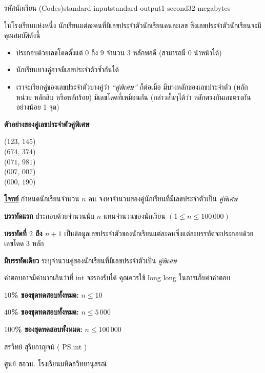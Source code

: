 \documentclass[11pt,a4paper]{article}
\begin{document}
\begin{problem}{รหัสนักเรียน (Codes)}{standard input}{standard output}{1 second}{32 megabytes}

ในโรงเรียนแห่งหนึ่ง นักเรียนแต่ละคนที่มีเลขประจำตัวนักเรียนคนละเลข ซึ่งเลขประจำตัวนักเรียนจะมีคุณสมบัติดังนี้

\begin{itemize}

\item ประกอบด้วยเลขโดดตั้งแต่ $0$ ถึง $9$ จำนวน $3$ หลักพอดี (สามารถมี $0$ นำหน้าได้)

       \item นักเรียนบางคู่อาจมีเลขประจำตัวซ้ำกันได้

       \item เราจะเรียกคู่ของเลขประจำตัวบางคู่ว่า \textit{“คู่พิเศษ”} ก็ต่อเมื่อ มีบางหลักของเลขประจำตัว (หลักหน่วย หลักสิบ หรือหลักร้อย) มีเลขโดดที่เหมือนกัน (กล่าวสั้นๆได้ว่า หลักตรงกันเลขตรงกันอย่างน้อย 1 จุด)
\end{itemize}

\textbf{ตัวอย่างของคู่เลขประจำตัวคู่พิเศษ}

($123$, $145$)\\ ($674$, $374$)  \\                ($071$, $981$)      \\            ($007$, $007$)      \\            ($000$, $190$)
    

\bigskip
\underline{\textbf{โจทย์}}  กำหนดนักเรียนจำนวน $n$ คน จงหาจำนวนของคู่นักเรียนที่มีเลขประจำตัวเป็น \textit{คู่พิเศษ}


\InputFile

\textbf{บรรทัดแรก} ประกอบด้วยจำนวนนับ $n$ แทนจำนวนของนักเรียน $( 1 \leq n \leq 100 \,000)$

\textbf{บรรทัดที่ $2$ ถึง $n+1$} เป็นข้อมูลเลขประจำตัวของนักเรียนแต่ละคนซึ่งแต่ละบรรทัดจะประกอบด้วยเลขโดด $3$ หลัก


\OutputFile

\textbf{มีบรรทัดเดียว} ระบุจำนวนคู่ของนักเรียนที่มีเลขประจำตัวเป็น\textit{ คู่พิเศษ}

\Examples

\begin{example}
%
%
\end{example}

\Note 

คำตอบอาจมีค่ามากเกินว่าที่ int จะรองรับได้ คุณควรใช้ long long ในการเก็บค่าคำตอบ
  
\Scoring
  
\textbf{$10$\% ของชุดทดสอบทั้งหมด:} $n \leq 10$

\textbf{$40$\% ของชุดทดสอบทั้งหมด:} $n \leq 5\,000$

\textbf{$100$\% ของชุดทดสอบทั้งหมด:} $n \leq 100\,000$

            
\Source

สรวิทย์  สุริยกาญจน์ ( PS.int )

ศูนย์ สอวน. โรงเรียนมหิดลวิทยานุสรณ์

\end{problem}
\end{document}
